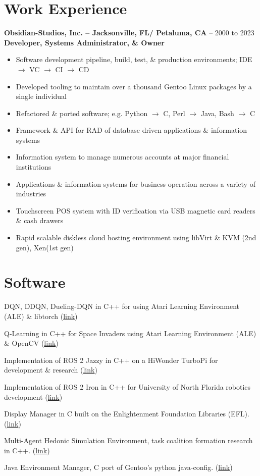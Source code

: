 \documentclass[10pt]{report}
\begin{document}
\section*{Work Experience}
\textbf{Obsidian-Studios, Inc. – Jacksonville, FL/ Petaluma, CA} – 2000 to 2023\newline
\textbf{Developer, Systems Administrator, \& Owner}
\begin{itemize}
  \item Software development pipeline, build, test, \& production environments; IDE $\rightarrow$ VC $\rightarrow$ CI $\rightarrow$ CD
  \item Developed tooling to maintain over a thousand Gentoo Linux packages by a single individual
  \item Refactored \& ported software; e.g. Python $\rightarrow$ C, Perl $\rightarrow$ Java, Bash $\rightarrow$ C
  \item Framework \& API for RAD of database driven applications \& information systems
  \item Information system to manage numerous accounts at major financial institutions
  \item Applications \& information systems for business operation across a variety of industries
  \item Touchscreen POS system with ID verification via USB magnetic card readers \& cash drawers
  \item Rapid scalable diskless cloud hosting environment using libVirt \& KVM (2nd gen), Xen(1st gen)
\end{itemize}

\section*{Software}
\begin{description}[style=multiline,leftmargin=11em]
  \item [dqn-space\_invaders] DQN, DDQN, Dueling-DQN in C++ for using Atari Learning Environment
  (ALE) \& libtorch (\href{https://github.com/wltjr/dqn-space_invaders}{link})
  \item [q-space\_invaders] Q-Learning in C++ for Space Invaders using Atari Learning Environment
  (ALE) \& OpenCV  (\href{https://github.com/wltjr/q-space_invaders}{link})
  \item [turbopi\_ros] Implementation of ROS 2 Jazzy in C++ on a HiWonder TurboPi for development \& research (\href{https://github.com/wltjr/turbopi_ros}{link})
  \item [osprey\_ros] Implementation of ROS 2 Iron in C++ for University of North Florida robotics development (\href{https://github.com/Osprey-Robotics/osprey_ros}{link})
  \item [entrance] Display Manager in C built on the Enlightenment Foundation Libraries (EFL). (\href{https://github.com/wltjr/entrance}{link})
  \item [mahse] Multi-Agent Hedonic Simulation Environment, task coalition formation research in C++. (\href{https://github.com/wltjr/mahse}{link})
  \item [jem] Java Environment Manager, C port of Gentoo's python java-config. (\href{https://github.com/Obsidian-StudiosInc/jem}{link})
\end{description}
\end{document}
